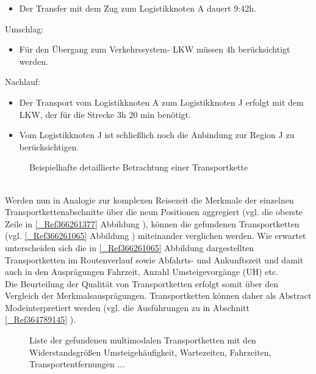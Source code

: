 \begin{itemize}
%
   \item Der Transfer mit dem Zug zum Logistikknoten A dauert 9:42h. 
%
\end{itemize}
Umschlag:~\\

\begin{itemize}
%
   \item Für den Übergang zum Verkehrssystem- LKW müssen 4h berücksichtigt werden.
%
\end{itemize}
Nachlauf:~\\

\begin{itemize}
%
   \item Der Transport vom Logistikknoten A zum Logistikknoten J erfolgt mit dem LKW, der für die Strecke 3h 20 min benötigt.
   \item Vom Logistikknoten J ist schließlich noch die Anbindung zur Region J zu berücksichtigen.
%
\end{itemize}

\begin{figure}[htbp]
  \centering
  \caption{ Beispielhafte detaillierte Betrachtung einer Transportkette}
  \label{_Ref366261377}
\end{figure}
~\\
Werden nun in Analogie zur komplexen Reisezeit die Merkmale der einzelnen Transportkettenabschnitte über die neun Positionen aggregiert (vgl. die oberste Zeile in \autoref{_Ref366261377} Abbildung ), können die gefundenen Transportketten (vgl. \autoref{_Ref366261065} Abbildung ) miteinander verglichen werden. Wie erwartet unterscheiden sich die in \autoref{_Ref366261065} Abbildung  dargestellten Transportketten im Routenverlauf sowie Abfahrts- und Ankunftszeit und damit auch in den Ausprägungen Fahrzeit, Anzahl Umsteigevorgänge (UH) etc.~\\
Die Beurteilung der Qualität von Transportketten erfolgt somit über den Vergleich der Merkmalsausprägungen. Transportketten können daher als \glqq Abstract Mode\grqq  interpretiert werden (vgl. die Ausführungen zu in Abschnitt \autoref{_Ref364789145} ).~\\

\begin{figure}[htbp]
  \centering
  \caption{ Liste der gefundenen multimodalen Transportketten mit den Widerstandsgrößen Umsteigehäufigkeit, Wartezeiten, Fahrzeiten, Transportentfernungen $\ldots$}
  \label{_Ref366261065}
\end{figure}
~\\


